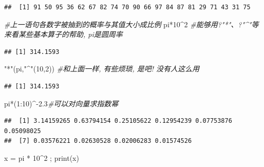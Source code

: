 \documentclass[
]{book}
\newenvironment{Shaded}{\begin{snugshade}}{\end{snugshade}}
\newcommand{\CommentTok}[1]{\textcolor[rgb]{0.56,0.35,0.01}{\textit{#1}}}
\newcommand{\DecValTok}[1]{\textcolor[rgb]{0.00,0.00,0.81}{#1}}
\newcommand{\FloatTok}[1]{\textcolor[rgb]{0.00,0.00,0.81}{#1}}
\newcommand{\FunctionTok}[1]{\textcolor[rgb]{0.00,0.00,0.00}{#1}}
\newcommand{\NormalTok}[1]{#1}
\newcommand{\OtherTok}[1]{\textcolor[rgb]{0.56,0.35,0.01}{#1}}
\newcommand{\SpecialCharTok}[1]{\textcolor[rgb]{0.00,0.00,0.00}{#1}}
\newcommand{\StringTok}[1]{\textcolor[rgb]{0.31,0.60,0.02}{#1}}
\begin{document}
\begin{verbatim}
##  [1] 91 50 95 36 62 67 82 74 70 90 66 97 84 87 81 29 71 43 31 75
\end{verbatim}

\begin{Shaded}
\begin{Highlighting}[]
\CommentTok{\#上一语句各数字被抽到的概率与其值大小成比例}
\NormalTok{pi}\SpecialCharTok{*}\DecValTok{10}\SpecialCharTok{\^{}}\DecValTok{2} \CommentTok{\#能够用?"*"、?"\^{}"等来看某些基本算子的帮助, pi是圆周率}
\end{Highlighting}
\end{Shaded}

\begin{verbatim}
## [1] 314.1593
\end{verbatim}

\begin{Shaded}
\begin{Highlighting}[]
\StringTok{"*"}\NormalTok{(pi,}\StringTok{"\^{}"}\NormalTok{(}\DecValTok{10}\NormalTok{,}\DecValTok{2}\NormalTok{)) }\CommentTok{\#和上面一样, 有些烦琐, 是吧! 没有人这么用}
\end{Highlighting}
\end{Shaded}

\begin{verbatim}
## [1] 314.1593
\end{verbatim}

\begin{Shaded}
\begin{Highlighting}[]
\NormalTok{pi}\SpecialCharTok{*}\NormalTok{(}\DecValTok{1}\SpecialCharTok{:}\DecValTok{10}\NormalTok{)}\SpecialCharTok{\^{}{-}}\FloatTok{2.3}\CommentTok{\#可以对向量求指数幂}
\end{Highlighting}
\end{Shaded}

\begin{verbatim}
##  [1] 3.14159265 0.63794154 0.25105622 0.12954239 0.07753876 0.05098025
##  [7] 0.03576221 0.02630528 0.02006283 0.01574526
\end{verbatim}

\begin{Shaded}
\begin{Highlighting}[]
\NormalTok{x }\OtherTok{=}\NormalTok{ pi }\SpecialCharTok{*} \DecValTok{10}\SpecialCharTok{\^{}}\DecValTok{2}\NormalTok{ ; }\FunctionTok{print}\NormalTok{(x) }
\end{Highlighting}
\end{Shaded}
\end{document}
